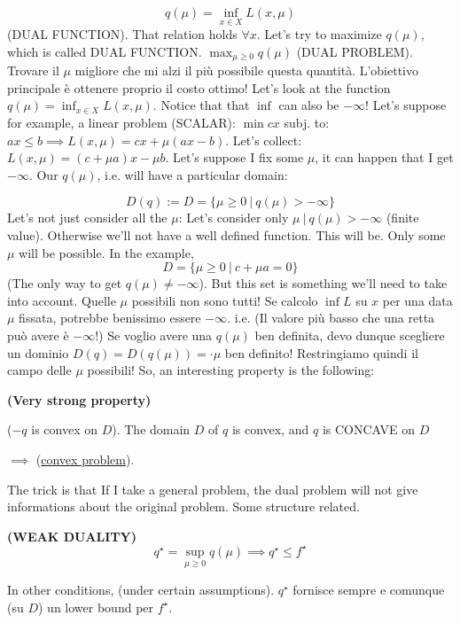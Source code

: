 \[
	q(\mu) = \inf_{x\in X}{L(x,\mu)}
\]
(DUAL FUNCTION). That relation holds $\forall x$. Let's try to maximize $q(\mu)$, which is called DUAL FUNCTION.
$\max_{\mu\geq 0}{q(\mu)}$ (DUAL PROBLEM). Trovare il $\mu$ migliore che mi alzi il più possibile questa quantità. L'obiettivo principale è ottenere proprio il costo ottimo! Let's look at the function $q(\mu) = \inf_{x\in X}{L(x,\mu)}$. Notice that that $\inf$ can also be $-\infty$! Let's suppose for example, a linear problem (SCALAR):
$\min{cx}$ subj. to: $ax\leq b \implies L(x,\mu) = cx + \mu(ax-b)$. Let's collect: $L(x,\mu) = (c+\mu a)x -\mu b$. Let's suppose I fix some $\mu$, it can happen that I get $-\infty$. Our $q(\mu)$, i.e. will have a particular domain:

\[
	D(q) := D = \{\mu\geq 0\ |\ q(\mu) > -\infty\}
\]
Let's not just consider all the $\mu$: Let's consider only $\mu\ |\ q(\mu)>-\infty$ (finite value). Otherwise we'll not have a well defined function. This will be. Only some $\mu$ will be possible. In the example,
\[
	D = \{\mu\geq 0\ |\ c+\mu a = 0\}
\]
(The only way to get $q(\mu)\neq -\infty$). But this set is something we'll need to take into account. Quelle $\mu$ possibili non sono tutti! Se calcolo $\inf{L}$ su $x$ per una data $\mu$ fissata, potrebbe benissimo essere $-\infty$. i.e. (Il valore più basso che una retta può avere è $-\infty$!) Se voglio avere una $q(\mu)$ ben definita, devo dunque scegliere un dominio $D(q) = D(q(\mu)) = \mathord{\cdot}\mu$ ben definito!
Restringiamo quindi il campo delle $\mu$ possibili! So, an interesting property is the following:

\begin{prop}{\textbf{(Very strong property)}}

($-q$ is convex on $D$). The domain $D$ of $q$ is convex, and $q$ is CONCAVE on $D$
\end{prop}

$\implies$ (\underline{convex problem}). 

The trick is that If I take a general problem, the dual problem will not give informations about the original problem. Some structure related.

\begin{prop}{\textbf{(WEAK DUALITY)}}
\[
	q^\star = \sup_{\mu\geq 0}{q(\mu)} \implies q^\star\leq f^\star
\]
\end{prop}

In other conditions, (under certain assumptions). $q^\star$ fornisce sempre e comunque (su $D$) un lower bound per $f^\star$.

